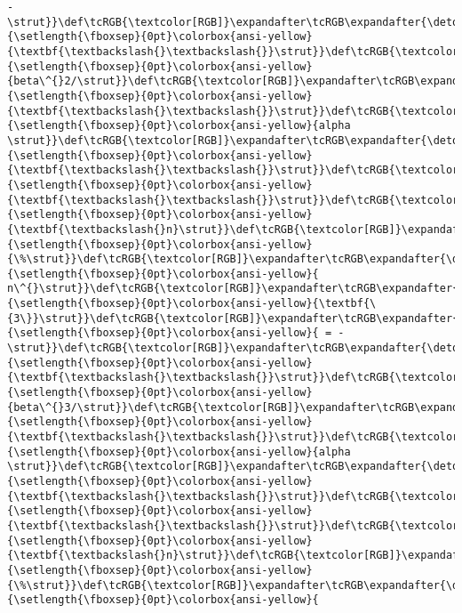 \documentclass[landscape,letterpaper,10pt,english]{article}
\begin{document}
\begin{Verbatim}[commandchars=\\\{\}, frame=single, framerule=2mm, rulecolor=\color{outerrorbackground}]
-\strut}}\def\tcRGB{\textcolor[RGB]}\expandafter\tcRGB\expandafter{\detokenize{175,95,0}}{\setlength{\fboxsep}{0pt}\colorbox{ansi-yellow}{\textbf{\textbackslash{}\textbackslash{}}\strut}}\def\tcRGB{\textcolor[RGB]}\expandafter\tcRGB\expandafter{\detokenize{175,0,0}}{\setlength{\fboxsep}{0pt}\colorbox{ansi-yellow}{beta\^{}2/\strut}}\def\tcRGB{\textcolor[RGB]}\expandafter\tcRGB\expandafter{\detokenize{175,95,0}}{\setlength{\fboxsep}{0pt}\colorbox{ansi-yellow}{\textbf{\textbackslash{}\textbackslash{}}\strut}}\def\tcRGB{\textcolor[RGB]}\expandafter\tcRGB\expandafter{\detokenize{175,0,0}}{\setlength{\fboxsep}{0pt}\colorbox{ansi-yellow}{alpha \strut}}\def\tcRGB{\textcolor[RGB]}\expandafter\tcRGB\expandafter{\detokenize{175,95,0}}{\setlength{\fboxsep}{0pt}\colorbox{ansi-yellow}{\textbf{\textbackslash{}\textbackslash{}}\strut}}\def\tcRGB{\textcolor[RGB]}\expandafter\tcRGB\expandafter{\detokenize{175,95,0}}{\setlength{\fboxsep}{0pt}\colorbox{ansi-yellow}{\textbf{\textbackslash{}\textbackslash{}}\strut}}\def\tcRGB{\textcolor[RGB]}\expandafter\tcRGB\expandafter{\detokenize{175,95,0}}{\setlength{\fboxsep}{0pt}\colorbox{ansi-yellow}{\textbf{\textbackslash{}n}\strut}}\def\tcRGB{\textcolor[RGB]}\expandafter\tcRGB\expandafter{\detokenize{175,0,0}}{\setlength{\fboxsep}{0pt}\colorbox{ansi-yellow}{\%\strut}}\def\tcRGB{\textcolor[RGB]}\expandafter\tcRGB\expandafter{\detokenize{175,0,0}}{\setlength{\fboxsep}{0pt}\colorbox{ansi-yellow}{  n\^{}\strut}}\def\tcRGB{\textcolor[RGB]}\expandafter\tcRGB\expandafter{\detokenize{175,95,135}}{\setlength{\fboxsep}{0pt}\colorbox{ansi-yellow}{\textbf{\{3\}}\strut}}\def\tcRGB{\textcolor[RGB]}\expandafter\tcRGB\expandafter{\detokenize{175,0,0}}{\setlength{\fboxsep}{0pt}\colorbox{ansi-yellow}{ = -\strut}}\def\tcRGB{\textcolor[RGB]}\expandafter\tcRGB\expandafter{\detokenize{175,95,0}}{\setlength{\fboxsep}{0pt}\colorbox{ansi-yellow}{\textbf{\textbackslash{}\textbackslash{}}\strut}}\def\tcRGB{\textcolor[RGB]}\expandafter\tcRGB\expandafter{\detokenize{175,0,0}}{\setlength{\fboxsep}{0pt}\colorbox{ansi-yellow}{beta\^{}3/\strut}}\def\tcRGB{\textcolor[RGB]}\expandafter\tcRGB\expandafter{\detokenize{175,95,0}}{\setlength{\fboxsep}{0pt}\colorbox{ansi-yellow}{\textbf{\textbackslash{}\textbackslash{}}\strut}}\def\tcRGB{\textcolor[RGB]}\expandafter\tcRGB\expandafter{\detokenize{175,0,0}}{\setlength{\fboxsep}{0pt}\colorbox{ansi-yellow}{alpha \strut}}\def\tcRGB{\textcolor[RGB]}\expandafter\tcRGB\expandafter{\detokenize{175,95,0}}{\setlength{\fboxsep}{0pt}\colorbox{ansi-yellow}{\textbf{\textbackslash{}\textbackslash{}}\strut}}\def\tcRGB{\textcolor[RGB]}\expandafter\tcRGB\expandafter{\detokenize{175,95,0}}{\setlength{\fboxsep}{0pt}\colorbox{ansi-yellow}{\textbf{\textbackslash{}\textbackslash{}}\strut}}\def\tcRGB{\textcolor[RGB]}\expandafter\tcRGB\expandafter{\detokenize{175,95,0}}{\setlength{\fboxsep}{0pt}\colorbox{ansi-yellow}{\textbf{\textbackslash{}n}\strut}}\def\tcRGB{\textcolor[RGB]}\expandafter\tcRGB\expandafter{\detokenize{175,0,0}}{\setlength{\fboxsep}{0pt}\colorbox{ansi-yellow}{\%\strut}}\def\tcRGB{\textcolor[RGB]}\expandafter\tcRGB\expandafter{\detokenize{175,0,0}}{\setlength{\fboxsep}{0pt}\colorbox{ansi-yellow}{  
\end{Verbatim}
\end{document}
